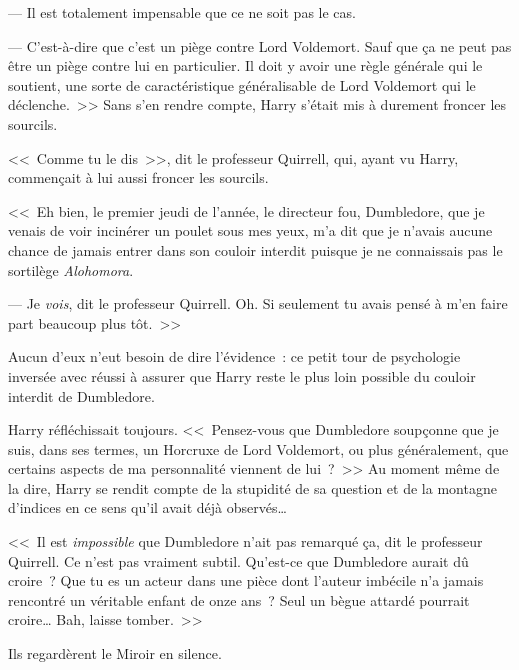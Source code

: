 --- Il est totalement impensable que ce ne soit pas le cas.

--- C'est-à-dire que c'est un piège contre Lord Voldemort. Sauf que ça ne peut pas être un piège contre lui en particulier. Il doit y avoir une règle générale qui le soutient, une sorte de caractéristique généralisable de Lord Voldemort qui le déclenche.~>> Sans s'en rendre compte, Harry s'était mis à durement froncer les sourcils.

<<~Comme tu le dis~>>, dit le professeur Quirrell, qui, ayant vu Harry, commençait à lui aussi froncer les sourcils.

<<~Eh bien, le premier jeudi de l'année, le directeur fou, Dumbledore, que je venais de voir incinérer un poulet sous mes yeux, m'a dit que je n'avais aucune chance de jamais entrer dans son couloir interdit puisque je ne connaissais pas le sortilège \emph{Alohomora}.

--- Je \emph{vois}, dit le professeur Quirrell. Oh. Si seulement tu avais pensé à m'en faire part beaucoup plus tôt.~>>

Aucun d'eux n'eut besoin de dire l'évidence~: ce petit tour de psychologie inversée avec réussi à assurer que Harry reste le plus loin possible du couloir interdit de Dumbledore.

Harry réfléchissait toujours. <<~Pensez-vous que Dumbledore soupçonne que je suis, dans ses termes, un Horcruxe de Lord Voldemort, ou plus généralement, que certains aspects de ma personnalité viennent de lui~?~>> Au moment même de la dire, Harry se rendit compte de la stupidité de sa question et de la montagne d'indices en ce sens qu'il avait déjà observés…

<<~Il est \emph{impossible} que Dumbledore n'ait pas remarqué ça, dit le professeur Quirrell. Ce n'est pas vraiment subtil. Qu'est-ce que Dumbledore aurait dû croire~? Que tu es un acteur dans une pièce dont l'auteur imbécile n'a jamais rencontré un véritable enfant de onze ans~? Seul un bègue attardé pourrait croire… Bah, laisse tomber.~>>

Ils regardèrent le Miroir en silence.

